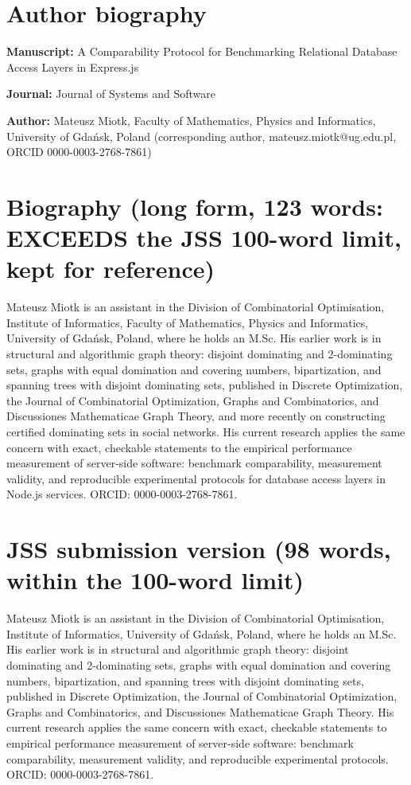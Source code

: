 \documentclass[11pt,a4paper]{article}
\begin{document}
\section*{Author biography}

\textbf{Manuscript:} A Comparability Protocol for Benchmarking Relational Database Access Layers in Express.js

\textbf{Journal:} Journal of Systems and Software

\textbf{Author:} Mateusz Miotk, Faculty of Mathematics, Physics and Informatics, University of Gdańsk, Poland (corresponding author, mateusz.miotk@ug.edu.pl, ORCID 0000-0003-2768-7861)

\section*{Biography (long form, 123 words: EXCEEDS the JSS 100-word limit, kept for reference)}

Mateusz Miotk is an assistant in the Division of Combinatorial Optimisation, Institute of Informatics, Faculty of Mathematics, Physics and Informatics, University of Gdańsk, Poland, where he holds an M.Sc. His earlier work is in structural and algorithmic graph theory: disjoint dominating and 2-dominating sets, graphs with equal domination and covering numbers, bipartization, and spanning trees with disjoint dominating sets, published in Discrete Optimization, the Journal of Combinatorial Optimization, Graphs and Combinatorics, and Discussiones Mathematicae Graph Theory, and more recently on constructing certified dominating sets in social networks. His current research applies the same concern with exact, checkable statements to the empirical performance measurement of server-side software: benchmark comparability, measurement validity, and reproducible experimental protocols for database access layers in Node.js services. ORCID: 0000-0003-2768-7861.

\section*{JSS submission version (98 words, within the 100-word limit)}

Mateusz Miotk is an assistant in the Division of Combinatorial Optimisation, Institute of Informatics, University of Gdańsk, Poland, where he holds an M.Sc. His earlier work is in structural and algorithmic graph theory: disjoint dominating and 2-dominating sets, graphs with equal domination and covering numbers, bipartization, and spanning trees with disjoint dominating sets, published in Discrete Optimization, the Journal of Combinatorial Optimization, Graphs and Combinatorics, and Discussiones Mathematicae Graph Theory. His current research applies the same concern with exact, checkable statements to empirical performance measurement of server-side software: benchmark comparability, measurement validity, and reproducible experimental protocols. ORCID: 0000-0003-2768-7861.
\end{document}
